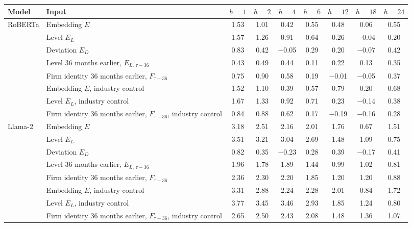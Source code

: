 \begin{table}[htbp]
{\footnotesize
\begin{adjustbox}{max width=\linewidth, max totalheight=0.75\textheight}
\begin{tabular}{llccccccc}
\toprule
Model & Input & $h=1$ & $h=2$ & $h=4$ & $h=6$ & $h=12$ & $h=18$ & $h=24$ \\
\midrule
RoBERTa & Embedding $E$ & 1.53 & 1.01 & \phantom{$-$}0.42 & 0.55 & \phantom{$-$}0.48 & \phantom{$-$}0.06 & 0.55 \\
 & Level $E_L$ & 1.57 & 1.26 & \phantom{$-$}0.91 & 0.64 & \phantom{$-$}0.26 & $-$0.04 & 0.20 \\
 & Deviation $E_D$ & 0.83 & 0.42 & $-$0.05 & 0.29 & \phantom{$-$}0.20 & $-$0.07 & 0.42 \\
 & Level 36 months earlier, $E_{L,\,\tau-36}$ & 0.43 & 0.49 & \phantom{$-$}0.44 & 0.11 & \phantom{$-$}0.22 & \phantom{$-$}0.13 & 0.35 \\
 & Firm identity 36 months earlier, $F_{\tau-36}$ & 0.75 & 0.90 & \phantom{$-$}0.58 & 0.19 & $-$0.01 & $-$0.05 & 0.37 \\
 & Embedding $E$, industry control & 1.52 & 1.10 & \phantom{$-$}0.39 & 0.57 & \phantom{$-$}0.79 & \phantom{$-$}0.20 & 0.68 \\
 & Level $E_L$, industry control & 1.67 & 1.33 & \phantom{$-$}0.92 & 0.71 & \phantom{$-$}0.23 & $-$0.14 & 0.38 \\
 & Firm identity 36 months earlier, $F_{\tau-36}$, industry control & 0.84 & 0.88 & \phantom{$-$}0.62 & 0.17 & $-$0.19 & $-$0.16 & 0.28 \\
\midrule
Llama-2 & Embedding $E$ & 3.18 & 2.51 & \phantom{$-$}2.16 & 2.01 & \phantom{$-$}1.76 & \phantom{$-$}0.67 & 1.51 \\
 & Level $E_L$ & 3.51 & 3.21 & \phantom{$-$}3.04 & 2.69 & \phantom{$-$}1.48 & \phantom{$-$}1.09 & 0.75 \\
 & Deviation $E_D$ & 0.82 & 0.35 & $-$0.23 & 0.28 & \phantom{$-$}0.39 & $-$0.17 & 0.41 \\
 & Level 36 months earlier, $E_{L,\,\tau-36}$ & 1.96 & 1.78 & \phantom{$-$}1.89 & 1.44 & \phantom{$-$}0.99 & \phantom{$-$}1.02 & 0.81 \\
 & Firm identity 36 months earlier, $F_{\tau-36}$ & 2.36 & 2.30 & \phantom{$-$}2.20 & 1.85 & \phantom{$-$}1.20 & \phantom{$-$}1.20 & 0.88 \\
 & Embedding $E$, industry control & 3.31 & 2.88 & \phantom{$-$}2.24 & 2.28 & \phantom{$-$}2.01 & \phantom{$-$}0.84 & 1.72 \\
 & Level $E_L$, industry control & 3.77 & 3.45 & \phantom{$-$}3.46 & 2.93 & \phantom{$-$}1.85 & \phantom{$-$}1.24 & 0.80 \\
 & Firm identity 36 months earlier, $F_{\tau-36}$, industry control & 2.65 & 2.50 & \phantom{$-$}2.43 & 2.08 & \phantom{$-$}1.48 & \phantom{$-$}1.36 & 1.07 \\
\bottomrule
\end{tabular}
\end{adjustbox}
}
\end{table}
